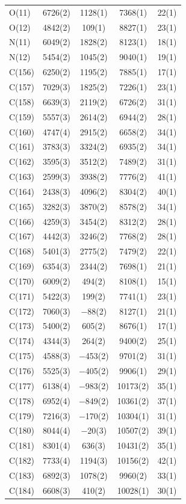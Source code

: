 \begin{center}
{\begin{supertabular}{lcccc}
O(11)&6726(2)&1128(1)&7368(1)&22(1)\\
O(12)&4842(2)&109(1)&8827(1)&23(1)\\
N(11)&6049(2)&1828(2)&8123(1)&18(1)\\
N(12)&5454(2)&1045(2)&9040(1)&19(1)\\
C(156)&6250(2)&1195(2)&7885(1)&17(1)\\
C(157)&7029(3)&1825(2)&7226(1)&23(1)\\
C(158)&6639(3)&2119(2)&6726(2)&31(1)\\
C(159)&5557(3)&2614(2)&6944(2)&28(1)\\
C(160)&4747(4)&2915(2)&6658(2)&34(1)\\
C(161)&3783(3)&3324(2)&6935(2)&34(1)\\
C(162)&3595(3)&3512(2)&7489(2)&31(1)\\
C(163)&2599(3)&3938(2)&7776(2)&41(1)\\
C(164)&2438(3)&4096(2)&8304(2)&40(1)\\
C(165)&3282(3)&3870(2)&8578(2)&34(1)\\
C(166)&4259(3)&3454(2)&8312(2)&28(1)\\
C(167)&4442(3)&3246(2)&7768(2)&28(1)\\
C(168)&5401(3)&2775(2)&7479(2)&22(1)\\
C(169)&6354(3)&2344(2)&7698(1)&21(1)\\
C(170)&6009(2)&494(2)&8108(1)&15(1)\\
C(171)&5422(3)&199(2)&7741(1)&23(1)\\
C(172)&7060(3)&$-$88(2)&8127(1)&21(1)\\
C(173)&5400(2)&605(2)&8676(1)&17(1)\\
C(174)&4344(3)&264(2)&9400(2)&25(1)\\
C(175)&4588(3)&$-$453(2)&9701(2)&31(1)\\
C(176)&5525(3)&$-$405(2)&9906(1)&29(1)\\
C(177)&6138(4)&$-$983(2)&10173(2)&35(1)\\
C(178)&6952(4)&$-$849(2)&10361(2)&37(1)\\
C(179)&7216(3)&$-$170(2)&10304(1)&31(1)\\
C(180)&8044(4)&$-$20(3)&10507(2)&39(1)\\
C(181)&8301(4)&636(3)&10431(2)&35(1)\\
C(182)&7733(4)&1194(3)&10156(2)&42(1)\\
C(183)&6892(3)&1078(2)&9960(2)&33(1)\\
C(184)&6608(3)&410(2)&10028(1)&30(1)\\

\end{supertabular}}
\end{center}
